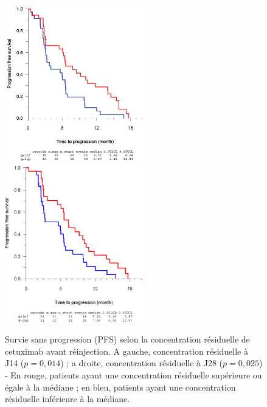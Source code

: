 \begin{figure}[htbp]
	\centering
		\includegraphics[width=6cm]{figures/raster/FIG_31a}
		\includegraphics[width=6cm]{figures/raster/FIG_31b}
	\caption{Survie sans progression (PFS) selon la concentration résiduelle de cetuximab avant réinjection. A gauche, concentration résiduelle à J14 ($p = 0,014$) ; a droite, concentration résiduelle à J28 ($p = 0,025$) - En rouge, patients ayant une concentration résiduelle supérieure ou égale à la médiane ; en bleu, patients ayant une concentration résiduelle inférieure à la médiane.}
	\label{fig:31}
\end{figure}
